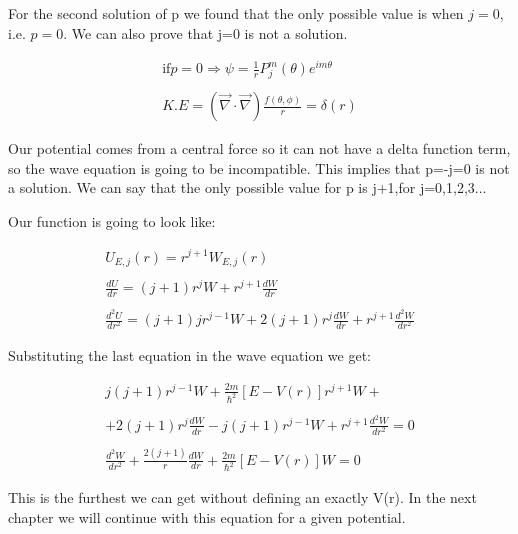 For the second solution of p we found that the only possible value is when $j=0$, i.e. $p=0$. We can also prove that j=0 is not a solution.

\begin{equation}
  \begin{array}{c}
    \text{if} p=0 \Rightarrow \psi = \frac{1}{r}P_j^m(\theta)e^{im\theta}
    \\

    \\
    K.E = \left(\vec{\nabla}\cdot\vec{\nabla}\right) \frac{f(\theta,\phi)}{r} = \delta(r)
  \end{array}
\end{equation}

Our potential comes from a central force so it can not have a delta function term, so the wave equation is going to be incompatible. This implies that p=-j=0 is not a solution. We can say that the only possible value for p is j+1,for j=0,1,2,3...

Our function is going to look like:

\begin{equation}
  \begin{array}{c}
    U_{E,j}(r) = r^{j+1}W_{E,j}(r)
    \\

    \\
    \frac{dU}{dr} = (j+1)r^jW + r^{j+1}\frac{dW}{dr}
    \\

    \\
    \frac{d^2U}{dr^2} = (j+1)jr^{j-1}W + 2(j+1)r^j\frac{dW}{dr} + r^{j+1}\frac{d^2W}{dr^2}
  \end{array}
\end{equation}

Substituting the last equation in the wave equation we get:

\begin{equation}
  \begin{array}{c}
    j(j+1)r^{j-1}W+\frac{2m}{\hbar^2}[E-V(r)]r^{j+1} W +
    \\

    \\
    + 2(j+1)r^j\frac{dW}{dr} - j(j+1)r^{j-1}W + r^{j+1}\frac{d^2W}{dr^2} = 0
    \\

    \\
    \frac{d^2W}{dr^2} + \frac{2(j+1)}{r}\frac{dW}{dr}+\frac{2m}{\hbar^2}[E-V(r)] W = 0
  \end{array}
\end{equation}

This is the furthest we can get without defining an exactly V(r). In the next chapter we will continue with this equation for a given potential.
